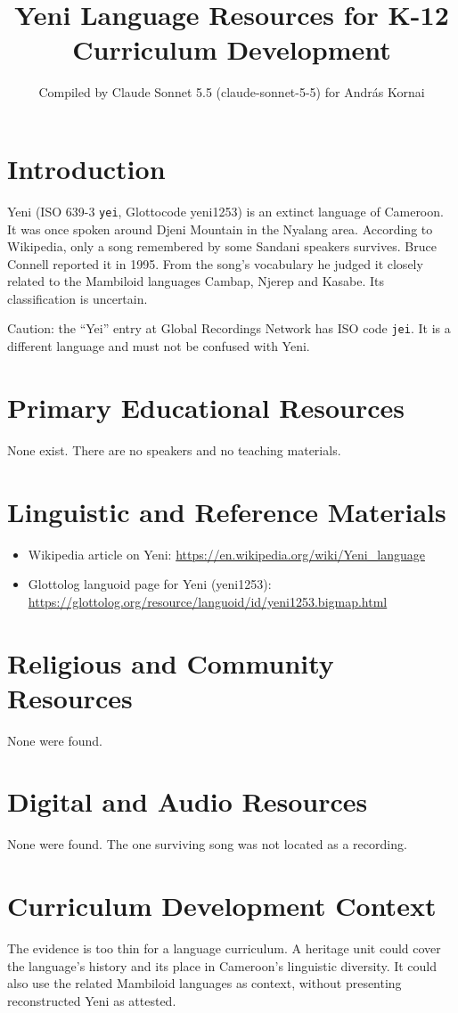 \documentclass[12pt]{article}
\title{Yeni Language Resources for K-12 Curriculum Development}
\author{Compiled by Claude Sonnet 5.5 (claude-sonnet-5-5) for Andr\'as Kornai}
\date{}
\begin{document}
\maketitle

\section{Introduction}
Yeni (ISO 639-3 \texttt{yei}, Glottocode yeni1253) is an extinct language of Cameroon. It was once spoken around Djeni Mountain in the Nyalang area. According to Wikipedia, only a song remembered by some Sandani speakers survives. Bruce Connell reported it in 1995. From the song's vocabulary he judged it closely related to the Mambiloid languages Cambap, Njerep and Kasabe. Its classification is uncertain.

Caution: the ``Yei'' entry at Global Recordings Network has ISO code \texttt{jei}. It is a different language and must not be confused with Yeni.

\section{Primary Educational Resources}
None exist. There are no speakers and no teaching materials.

\section{Linguistic and Reference Materials}
\begin{itemize}
\item Wikipedia article on Yeni: \url{https://en.wikipedia.org/wiki/Yeni_language}
\item Glottolog languoid page for Yeni (yeni1253): \url{https://glottolog.org/resource/languoid/id/yeni1253.bigmap.html}
\end{itemize}

\section{Religious and Community Resources}
None were found.

\section{Digital and Audio Resources}
None were found. The one surviving song was not located as a recording.

\section{Curriculum Development Context}
The evidence is too thin for a language curriculum. A heritage unit could cover the language's history and its place in Cameroon's linguistic diversity. It could also use the related Mambiloid languages as context, without presenting reconstructed Yeni as attested.
\end{document}
